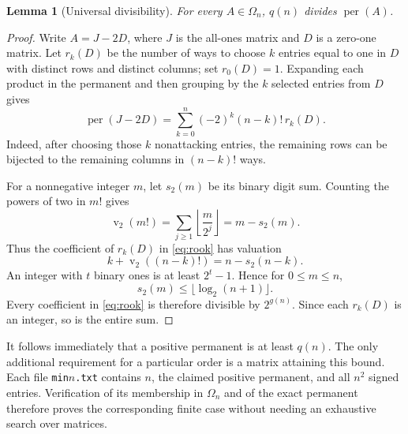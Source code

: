\documentclass[11pt,a4paper]{article}
\newtheorem{lemma}[theorem]{Lemma}
\theoremstyle{remark}\newtheorem{remark}[theorem]{Remark}
\DeclareMathOperator{\per}{per}
\DeclareMathOperator{\val}{v}
\newcommand{\Om}{\Omega}
\begin{document}
\begin{lemma}[Universal divisibility]\label{lem:divisor}
For every $A\in\Om_n$, $q(n)$ divides $\per(A)$.
\end{lemma}
\begin{proof}
Write $A=J-2D$, where $J$ is the all-ones matrix and $D$ is a zero-one matrix. Let $r_k(D)$ be the number of ways to choose $k$ entries equal to one in $D$ with distinct rows and distinct columns; set $r_0(D)=1$. Expanding each product in the permanent and then grouping by the $k$ selected entries from $D$ gives
\begin{equation}\label{eq:rook}
 \per(J-2D)=\sum_{k=0}^n(-2)^k(n-k)!\,r_k(D).
\end{equation}
Indeed, after choosing those $k$ nonattacking entries, the remaining rows can be bijected to the remaining columns in $(n-k)!$ ways.

For a nonnegative integer $m$, let $s_2(m)$ be its binary digit sum. Counting the powers of two in $m!$ gives
\[
 \val_2(m!)=\sum_{j\geq1}\left\lfloor\frac{m}{2^j}\right\rfloor=m-s_2(m).
\]
Thus the coefficient of $r_k(D)$ in \eqref{eq:rook} has valuation
\[
 k+\val_2((n-k)!)=n-s_2(n-k).
\]
An integer with $t$ binary ones is at least $2^t-1$. Hence for $0\leq m\leq n$,
\[
 s_2(m)\leq\lfloor\log_2(n+1)\rfloor.
\]
Every coefficient in \eqref{eq:rook} is therefore divisible by $2^{g(n)}$. Since each $r_k(D)$ is an integer, so is the entire sum.
\end{proof}

It follows immediately that a positive permanent is at least $q(n)$. The only additional requirement for a particular order is a matrix attaining this bound. Each file \texttt{min$n$.txt} contains $n$, the claimed positive permanent, and all $n^2$ signed entries. Verification of its membership in $\Om_n$ and of the exact permanent therefore proves the corresponding finite case without needing an exhaustive search over matrices.
\end{document}

